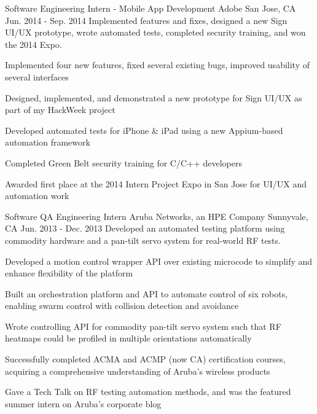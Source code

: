 \begin{cventries}
\cventry
    {Software Engineering Intern - Mobile App Development} %
    {Adobe} %
    {San Jose, CA} %
    {Jun. 2014 - Sep. 2014} %
    {Implemented features and fixes, designed a new Sign UI/UX prototype, wrote automated tests, completed security training, and won the 2014 Expo.} %
    {
      \begin{cvitems} %
        \item {Implemented four new features, fixed several existing bugs, improved usability of several interfaces}
        \item {Designed, implemented, and demonstrated a new prototype for Sign UI/UX as part of my HackWeek project}
        \item {Developed automated tests for iPhone \& iPad using a new Appium-based automation framework}
        \item {Completed Green Belt security training for C/C++ developers}
        \item {Awarded first place at the 2014 Intern Project Expo in San Jose for UI/UX and automation work}
      \end{cvitems}
    }

\cventry
    {Software QA Engineering Intern} %
    {Aruba Networks, an HPE Company} %
    {Sunnyvale, CA} %
    {Jun. 2013 - Dec. 2013} %
    {Developed an automated testing platform using commodity hardware and a pan-tilt servo system for real-world RF tests.} %
    {
      \begin{cvitems} %
        \item {Developed a motion control wrapper API over existing microcode to simplify and enhance flexibility of the platform}
        \item {Built an orchestration platform and API to automate control of six robots, enabling swarm control with collision detection and avoidance}
        \item {Wrote controlling API for commodity pan-tilt servo system such that RF heatmaps could be profiled in multiple orientations automatically}
        \item {Successfully completed ACMA and ACMP (now CA) certification courses, acquiring a comprehensive understanding of Aruba's wireless products}
        \item {Gave a Tech Talk on RF testing automation methods, and was the featured summer intern on Aruba's corporate blog}
      \end{cvitems}
    }


\end{cventries}

